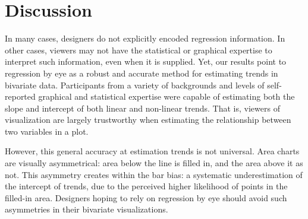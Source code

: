 \documentclass{sigchi}
\begin{document}



\section{Discussion}

In many cases, designers do not explicitly encoded regression information. In other cases, viewers may not have the statistical or graphical expertise to interpret such information, even when it is supplied. Yet, our results point to regression by eye as a robust and accurate method for estimating trends in bivariate data. Participants from a variety of backgrounds and levels of self-reported graphical and statistical expertise were capable of estimating both the slope and intercept of both linear and non-linear trends. That is, viewers of visualization are largely trustworthy when estimating the relationship between two variables in a plot.

However, this general accuracy at estimation trends is not universal. Area charts are visually asymmetrical: area below the line is filled in, and the area above it as not. This asymmetry creates within the bar bias: a systematic underestimation of the intercept of trends, due to the perceived higher likelihood of points in the filled-in area. Designers hoping to rely on regression by eye should avoid such asymmetries in their bivariate visualizations.
\end{document}
